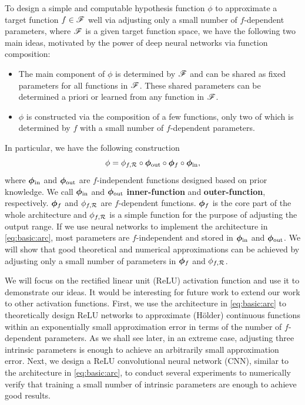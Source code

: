 \documentclass[nohyperref]{article}
\def\bmphiin{\bmphi_{\tn{in}}}
\def\bmphiout{\bmphi_{\tn{out}}}
\theoremstyle{plain}
\theoremstyle{definition}
\theoremstyle{remark}
\begin{document}
To design a simple and computable hypothesis function $\phi$ to approximate a target function $f\in{\mathscr{F}}$ well via adjusting only a small number of $f$-dependent parameters, where ${\mathscr{F}}$ is a given target function space, 
we have the following two main ideas, motivated by the power of deep neural networks via function composition:
 \begin{itemize}
 	 \item The main component of $\phi$ is determined by ${\mathscr{F}}$ and can be shared as fixed parameters for all functions in ${\mathscr{F}}$. These shared parameters can be determined a priori or learned from any function in ${\mathscr{F}}$.
 	\item  $\phi$ is constructed via the composition of a few functions, only two of which is determined by $f$ with a small number of $f$-dependent parameters.
 \end{itemize}
In particular, we have the following construction
\begin{equation}\label{eq:basic:arc}
	\phi = \phi_{f,\calR}\circ\bmphiout\circ\bmphi_f\circ\bmphiin,
\end{equation}
where $\bmphiin$ and $\bmphiout$ are $f$-independent functions designed based on prior knowledge. We call $\bmphiin$ and $\bmphiout$ \textbf{inner-function} and \textbf{outer-function}, respectively. ${\bm{\phi}}_f$ and $\phi_{f,{\mathcal{R}}}$ are $f$-dependent functions.  
${\bm{\phi}}_f$ is the core part of the whole architecture and 
$\phi_{f,{\mathcal{R}}}$ is a simple function for the purpose of adjusting the output range. 
If we use neural networks to implement the architecture in \eqref{eq:basic:arc}, most parameters are $f$-independent and stored in $\bmphiin$ and $\bmphiout$. We will show that good theoretical and numerical approximations can be achieved by adjusting only a small number of parameters in ${\bm{\phi}}_f$ and $\phi_{f,{\mathcal{R}}}$. 


We will focus on the rectified linear unit (ReLU) activation function and use it to demonstrate our ideas. It would be interesting for future work to extend our work to other activation functions. 
First, we use the architecture in \eqref{eq:basic:arc} to theoretically design ReLU networks to approximate (H\"older) continuous functions within an exponentially small approximation error in terms of the number of  $f$-dependent parameters. As we shall see later, in an extreme case, adjusting three intrinsic parameters is enough to achieve an arbitrarily small approximation error.
Next, 
we design a ReLU convolutional neural network (CNN), similar to the architecture in \eqref{eq:basic:arc}, 
to conduct several experiments to numerically verify that
training a small number of intrinsic parameters are enough to achieve good results.
\end{document}
